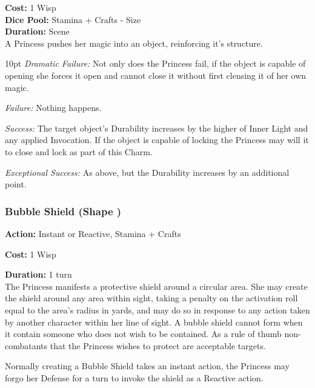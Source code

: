 \noindent \textbf{Cost:} 1 Wisp\\

\noindent \textbf{Dice Pool:} Stamina + Crafts - Size\\

\noindent \textbf{Duration:} Scene \\

\noindent A Princess pushes her magic into an object, reinforcing it's structure. 

\begin{myindentpar}{10pt}    \emph{Dramatic Failure:} Not only does the Princess fail, if the object is capable of opening she forces it open and cannot close it without first clensing it of her own magic. 

\emph{Failure:} Nothing happens. 

\emph{Success:} The target object's Durability increases by the higher of Inner Light and any applied Invocation. If the object is capable of locking the Princess may will it to close and lock as part of this Charm.

\emph{Exceptional Success:} As above, but the Durability increases by an additional point.

\end{myindentpar}

\subsubsection*{Bubble Shield (Shape \textbullet)}

\noindent \textbf{Action:} Instant or Reactive, Stamina + Crafts

\noindent \textbf{Cost:} 1 Wisp

\noindent \textbf{Duration:} 1 turn \\

\noindent The Princess manifests a protective shield around a circular area. She may create the shield around any area within sight, taking a penalty on the activation roll equal to the area’s radius in yards, and may do so in
response to any action taken by another character within her line of sight. A bubble shield cannot form when it contain someone who does not wish to be contained. As a rule of thumb non-combatants that the Princess wishes to protect are acceptable targets. 

Normally creating a Bubble Shield takes an instant action, the Princess may forgo her Defense for a turn to invoke the shield as a Reactive action. 


